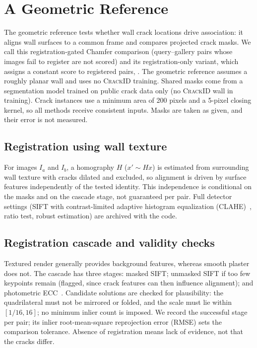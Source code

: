 \section{A Geometric Reference}
\label{sec:method}

The geometric reference tests whether wall crack locations drive association: it aligns wall surfaces to a common frame and compares projected crack masks.
We call this registration-gated Chamfer comparison \ours{} (query--gallery pairs whose images fail to register are not scored) and its registration-only variant, which assigns a constant score to registered pairs, \regonly{}.
The geometric reference assumes a roughly planar wall and uses no \textsc{CrackID} training.
Shared masks come from a segmentation model trained on public crack data only (no \textsc{CrackID} wall in training).
Crack instances use a minimum area of 200 pixels and a 5-pixel closing kernel, so all methods receive consistent inputs.
Masks are taken as given, and their error is not measured.

\subsection{Registration using wall texture}
\label{sec:registration}

For images $I_a$ and $I_b$, a homography $H$ ($x' \sim Hx$) is estimated from surrounding wall texture with cracks dilated and excluded, so alignment is driven by surface features independently of the tested identity.
This independence is conditional on the masks and on the cascade stage, not guaranteed per pair.
Full detector settings (SIFT with contrast-limited adaptive histogram equalization (CLAHE)~\cite{zuiderveld1994clahe}, ratio test, robust estimation) are archived with the code.

\subsection{Registration cascade and validity checks}
\label{sec:cascade}

Textured render generally provides background features, whereas smooth plaster does not.
The cascade has three stages: masked SIFT; unmasked SIFT if too few keypoints remain (flagged, since crack features can then influence alignment); and photometric ECC~\cite{evangelidis2008ecc}.
Candidate solutions are checked for plausibility: the quadrilateral must not be mirrored or folded, and the scale must lie within $[1/16,16]$; no minimum inlier count is imposed.
We record the successful stage per pair; its inlier root-mean-square reprojection error (RMSE) sets the comparison tolerance.
Absence of registration means lack of evidence, not that the cracks differ.

